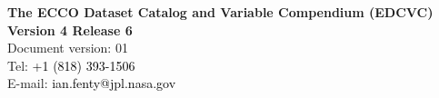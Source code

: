 \pagebreak
\begin{center}
    \vspace*{2cm}
    {\Large \textbf{The ECCO Dataset Catalog and Variable Compendium (EDCVC)}}\\[3cm]
    {\LARGE \textbf{Version 4 Release 6}}\\[2.5cm]
    {\Large Document version: 01}\\[4cm]
    {\large Tel: \textcolor{black}{+1 (818) 393-1506}\\[.5cm]
    E-mail: \textcolor{black}{ian.fenty@jpl.nasa.gov}}\\[2cm]
\end{center}
\newpage
